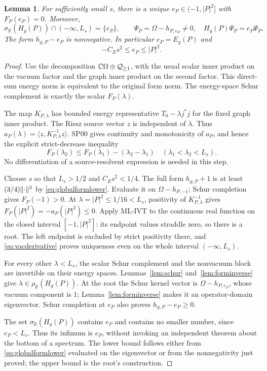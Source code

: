 \documentclass[11pt,a4paper]{article}
\newtheorem{lemma}[theorem]{Lemma}
\theoremstyle{remark}\newtheorem{remark}[theorem]{Remark}
\newcommand{\R}{\mathbb R}\newcommand{\C}{\mathbb C}\newcommand{\N}{\mathbb N}
\newcommand{\abs}[1]{\lvert #1\rvert}\newcommand{\rankone}[2]{\lvert #1\rangle\langle #2\rvert}
\newcommand{\sigR}{\sigma_{\R}}
\newcommand{\resR}{\rho_{\R}}
\begin{document}
\begin{lemma}\label{lem:vacuumroot}
For sufficiently small $s$, there is a unique $e_P\in(-1,\abs P^2]$ with $F_P(e_P)=0$. Moreover,
\begin{equation}
 \sigR(H_g(P))\cap(-\infty,L_s)=\{e_P\},\qquad
 \Psi_P=\Omega-h_{P,e_P}\ne0,
 \quad H_g(P)\Psi_P=e_P\Psi_P.\label{eq:lowresult}
\end{equation}
The form $h_{g,P}-e_P$ is nonnegative. In particular $e_P=E_g(P)$ and
\[
 -C_Es^2\leq e_P\leq\abs P^2.
\]
\end{lemma}
\begin{proof}
Use the decomposition $\C\Omega\oplus\Q_{\geq1}$, with the usual scalar inner product on the vacuum factor and the graph inner product on the second factor. This direct-sum energy norm is equivalent to the original form norm. The energy-space Schur complement is exactly the scalar $F_P(\lambda)$.

The map $K_{P,\lambda}$ has bounded energy representative $T_0-\lambda j^*j$ for the fixed graph inner product. The Riesz source vector $z$ is independent of $\lambda$. Thus $a_P(\lambda)=\langle z,K_{P,\lambda}^{-1}z\rangle$. SP00 gives continuity and monotonicity of $a_P$, and hence the explicit strict-decrease inequality
\begin{equation}
 F_P(\lambda_2)\leq F_P(\lambda_1)-(\lambda_2-\lambda_1)
 \quad(\lambda_1<\lambda_2<L_s).
 \label{eq:vacderivative}
\end{equation}
No differentiation of a source-resolvent expression is needed in this step.

Choose $s$ so that $L_s>1/2$ and $C_Es^2<1/4$. The full form $h_{g,P}+1$ is at least $(3/4)\lVert \cdot\rVert^2$ by \eqref{eq:globalformlower}. Evaluate it on $\Omega-h_{P,-1}$; Schur completion gives $F_P(-1)>0$. At $\lambda=\abs P^2\leq1/16<L_s$, positivity of $K_{P,\lambda}^{-1}$ gives $F_P(\abs P^2)=-a_P(\abs P^2)\leq0$. Apply ML-IVT to the continuous real function on the closed interval $[-1,|P|^2]$: its endpoint values straddle zero, so there is a root. The left endpoint is excluded by strict positivity there, and \eqref{eq:vacderivative} proves uniqueness even on the whole interval $(-\infty,L_s)$.

For every other $\lambda<L_s$, the scalar Schur complement and the nonvacuum block are invertible on their energy spaces. Lemmas~\ref{lem:schur} and~\ref{lem:forminverse} give $\lambda\in\resR(H_g(P))$. At the root the Schur kernel vector is $\Omega-h_{P,e_P}$, whose vacuum component is $1$; Lemma~\ref{lem:forminverse} makes it an operator-domain eigenvector. Schur completion at $e_P$ also proves $h_{g,P}-e_P\geq0$.

The set $\sigR(H_g(P))$ contains $e_P$ and contains no smaller number, since $e_P<L_s$. Thus its infimum is $e_P$, without invoking an independent theorem about the bottom of a spectrum. The lower bound follows either from \eqref{eq:globalformlower} evaluated on the eigenvector or from the nonnegativity just proved; the upper bound is the root's construction.
\end{proof}
\end{document}
